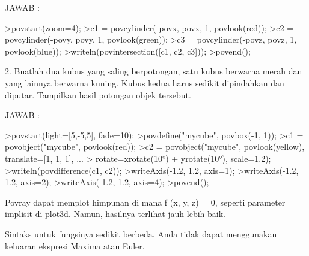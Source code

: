 \documentclass{article}
\begin{document}
\begin{eulernotebook}
\begin{eulercomment}
\begin{eulercomment}
\begin{eulercomment}
\begin{eulercomment}
\begin{eulercomment}
\begin{eulercomment}
\begin{eulercomment}
\begin{eulercomment}
\begin{eulercomment}
\begin{eulercomment}
\begin{eulercomment}
\begin{eulercomment}
\begin{eulercomment}
\begin{eulercomment}
\begin{eulercomment}
\begin{eulercomment}
\begin{eulercomment}
\begin{eulercomment}
\begin{eulercomment}
\begin{eulercomment}
\begin{eulercomment}
\begin{eulercomment}
\begin{eulercomment}
\begin{eulercomment}
\begin{eulercomment}
JAWAB :
\end{eulercomment}
\begin{eulerprompt}
>povstart(zoom=4);
>c1 = povcylinder(-povx, povx, 1, povlook(red));
>c2 = povcylinder(-povy, povy, 1, povlook(green));
>c3 = povcylinder(-povz, povz, 1, povlook(blue));
>writeln(povintersection([c1, c2, c3]));
>povend();
\end{eulerprompt}
\begin{eulercomment}
2. Buatlah dua kubus yang saling berpotongan, satu kubus berwarna
merah dan yang lainnya berwarna kuning. Kubus kedua harus sedikit
dipindahkan dan diputar. Tampilkan hasil potongan objek tersebut.

JAWAB :
\end{eulercomment}
\begin{eulerprompt}
>povstart(light=[5,-5,5], fade=10);
>povdefine("mycube", povbox(-1, 1));
>c1 = povobject("mycube", povlook(red));
>c2 = povobject("mycube", povlook(yellow), translate=[1, 1, 1], ...
> rotate=xrotate(10°) + yrotate(10°), scale=1.2);
>writeln(povdifference(c1, c2));
>writeAxis(-1.2, 1.2, axis=1);
>writeAxis(-1.2, 1.2, axis=2);
>writeAxis(-1.2, 1.2, axis=4);
>povend();
\end{eulerprompt}
\eulersubheading{}
\begin{eulercomment}
\begin{eulercomment}
\begin{eulercomment}
Povray dapat memplot himpunan di mana f (x, y, z) = 0, seperti
parameter implisit di plot3d. Namun, hasilnya terlihat jauh lebih
baik.

Sintaks untuk fungsinya sedikit berbeda. Anda tidak dapat menggunakan
keluaran ekspresi Maxima atau Euler.


\end{eulercomment}
\end{eulercomment}
\end{eulercomment}
\end{eulercomment}
\end{eulercomment}
\end{eulercomment}
\end{eulercomment}
\end{eulercomment}
\end{eulercomment}
\end{eulercomment}
\end{eulercomment}
\end{eulercomment}
\end{eulercomment}
\end{eulercomment}
\end{eulercomment}
\end{eulercomment}
\end{eulercomment}
\end{eulercomment}
\end{eulercomment}
\end{eulercomment}
\end{eulercomment}
\end{eulercomment}
\end{eulercomment}
\end{eulercomment}
\end{eulercomment}
\end{eulercomment}
\end{eulercomment}
\end{eulernotebook}
\end{document}
